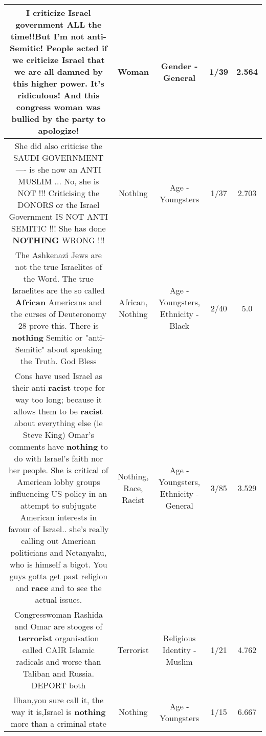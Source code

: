 \documentclass[11pt]{article}
\newlength\mylength
\begin{document}
\begin{center}
\begin{longtable}{|C{.65\mylength}|C{.30\mylength}|C{.12\mylength}|C{.12\mylength}|C{.12\mylength}|}
  \small I criticize Israel government ALL the time!!But I'm not anti-Semitic! People acted if we criticize Israel that we are all damned by this higher power. It's ridiculous! And this congress \textbf{woman} was bullied by the party to apologize!\normalsize   & Woman & Gender - General & 1/39 & 2.564 \\  \hline
  \small She did also criticise the SAUDI GOVERNMENT---- is she now an ANTI MUSLIM ... No, she is NOT !!! Criticising the DONORS or the Israel Government IS NOT ANTI SEMITIC !!! She has done \textbf{NOTHING} WRONG !!!\normalsize   & Nothing & Age - Youngsters & 1/37 & 2.703 \\  \hline
  \small The Ashkenazi Jews are not the true Israelites of the Word. The true Israelites are the so called \textbf{African} Americans and the curses of Deuteronomy 28 prove this. There is \textbf{nothing} Semitic or "anti-Semitic" about speaking the Truth. God Bless\normalsize   & African, Nothing & Age - Youngsters, Ethnicity - Black & 2/40 & 5.0 \\  \hline
  \small Cons have used Israel as their anti-\textbf{racist} trope for way too long; because it allows them to be \textbf{racist} about everything else (ie Steve King) Omar's comments have \textbf{nothing} to do with Israel's faith nor her people. She is critical of American lobby groups influencing US policy in an attempt to subjugate American interests in favour of Israel.. she's really calling out American politicians and Netanyahu, who is himself a bigot. You guys gotta get past religion and \textbf{race} and to see the actual issues.\normalsize   & Nothing, Race, Racist & Age - Youngsters, Ethnicity - General & 3/85 & 3.529 \\  \hline
  \small Congresswoman Rashida and Omar are stooges of \textbf{terrorist} organisation called CAIR Islamic radicals and worse than Taliban and Russia.  DEPORT both\normalsize   & Terrorist & Religious Identity - Muslim & 1/21 & 4.762 \\  \hline
  \small llhan,you sure call it, the  way it is,Israel is \textbf{nothing} more than a criminal state\normalsize   & Nothing & Age - Youngsters & 1/15 & 6.667 \\  \hline

\end{longtable}
\end{center}
\end{document}
